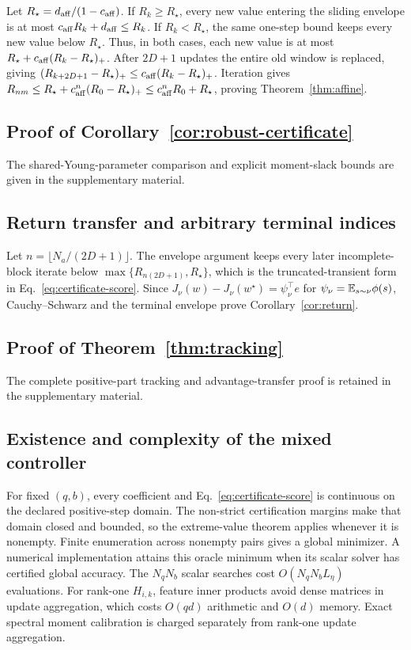 Let $R_\star=d_{\rm aff}/(1-c_{\rm aff})$.
If $R_k\ge R_\star$, every new value entering the sliding envelope is at most $c_{\rm aff}R_k+d_{\rm aff}\le R_k$.
If $R_k<R_\star$, the same one-step bound keeps every new value below $R_\star$.
Thus, in both cases, each new value is at most $R_\star+c_{\rm aff}(R_k-R_\star)_+$.
After $2D+1$ updates the entire old window is replaced, giving $(R_{k+2D+1}-R_\star)_+\le c_{\rm aff}(R_k-R_\star)_+$.
Iteration gives $R_{nm}\le R_\star+c_{\rm aff}^n(R_0-R_\star)_+\le c_{\rm aff}^nR_0+R_\star$, proving Theorem~\ref{thm:affine}.

\subsection{Proof of Corollary~\ref{cor:robust-certificate}}
The shared-Young-parameter comparison and explicit moment-slack bounds are given in the supplementary material.

\subsection{Return transfer and arbitrary terminal indices}
\label{app:return}
Let $n=\lfloor N_a/(2D+1)\rfloor$.
The envelope argument keeps every later incomplete-block iterate below $\max\{R_{n(2D+1)},R_\star\}$, which is the truncated-transient form in Eq.~\eqref{eq:certificate-score}.
Since $J_\nu(w)-J_\nu(w^\star)=\psi_\nu^\top e$ for $\psi_\nu=\mathbb{E}_{s\sim\nu}\phi(s)$, Cauchy--Schwarz and the terminal envelope prove Corollary~\ref{cor:return}.

\subsection{Proof of Theorem~\ref{thm:tracking}}
\label{app:tracking}
The complete positive-part tracking and advantage-transfer proof is retained in the supplementary material.

\subsection{Existence and complexity of the mixed controller}
\label{app:existence}
For fixed $(q,b)$, every coefficient and Eq.~\eqref{eq:certificate-score} is continuous on the declared positive-step domain.
The non-strict certification margins make that domain closed and bounded, so the extreme-value theorem applies whenever it is nonempty.
Finite enumeration across nonempty pairs gives a global minimizer.
A numerical implementation attains this oracle minimum when its scalar solver has certified global accuracy.
The $N_qN_b$ scalar searches cost $O(N_qN_bL_\eta)$ evaluations.
For rank-one $H_{i,k}$, feature inner products avoid dense matrices in update aggregation, which costs $O(qd)$ arithmetic and $O(d)$ memory.
Exact spectral moment calibration is charged separately from rank-one update aggregation.

